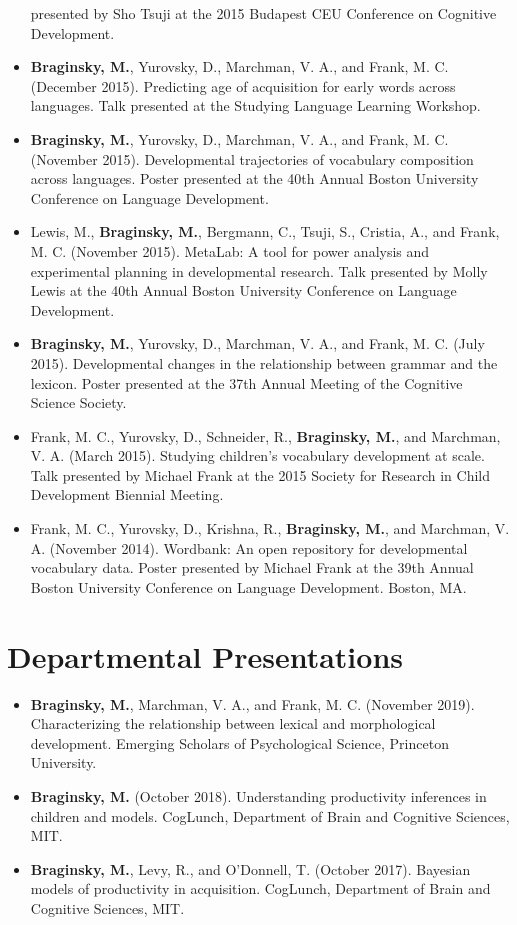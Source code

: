 \documentclass[11pt,]{article}
\begin{document}
\begin{itemize}
  presented by Sho Tsuji at the 2015 Budapest CEU Conference on
  Cognitive Development.
\item
  \textbf{Braginsky, M.}, Yurovsky, D., Marchman, V. A., and Frank, M.
  C. (December 2015). Predicting age of acquisition for early words
  across languages. Talk presented at the Studying Language Learning
  Workshop.
\item
  \textbf{Braginsky, M.}, Yurovsky, D., Marchman, V. A., and Frank, M.
  C. (November 2015). Developmental trajectories of vocabulary
  composition across languages. Poster presented at the 40th Annual
  Boston University Conference on Language Development.
\item
  Lewis, M., \textbf{Braginsky, M.}, Bergmann, C., Tsuji, S., Cristia,
  A., and Frank, M. C. (November 2015). MetaLab: A tool for power
  analysis and experimental planning in developmental research. Talk
  presented by Molly Lewis at the 40th Annual Boston University
  Conference on Language Development.
\item
  \textbf{Braginsky, M.}, Yurovsky, D., Marchman, V. A., and Frank, M.
  C. (July 2015). Developmental changes in the relationship between
  grammar and the lexicon. Poster presented at the 37th Annual Meeting
  of the Cognitive Science Society.
\item
  Frank, M. C., Yurovsky, D., Schneider, R., \textbf{Braginsky, M.}, and
  Marchman, V. A. (March 2015). Studying children's vocabulary
  development at scale. Talk presented by Michael Frank at the 2015
  Society for Research in Child Development Biennial Meeting.
\item
  Frank, M. C., Yurovsky, D., Krishna, R., \textbf{Braginsky, M.}, and
  Marchman, V. A. (November 2014). Wordbank: An open repository for
  developmental vocabulary data. Poster presented by Michael Frank at
  the 39th Annual Boston University Conference on Language Development.
  Boston, MA.
\end{itemize}

\hypertarget{departmental-presentations}{%
\section{Departmental Presentations}\label{departmental-presentations}}

\begin{itemize}
\item
  \textbf{Braginsky, M.}, Marchman, V. A., and Frank, M. C. (November
  2019). Characterizing the relationship between lexical and
  morphological development. Emerging Scholars of Psychological Science,
  Princeton University.
\item
  \textbf{Braginsky, M.} (October 2018). Understanding productivity
  inferences in children and models. CogLunch, Department of Brain and
  Cognitive Sciences, MIT.
\item
  \textbf{Braginsky, M.}, Levy, R., and O'Donnell, T. (October 2017).
  Bayesian models of productivity in acquisition. CogLunch, Department
  of Brain and Cognitive Sciences, MIT.
\end{itemize}
\end{document}
